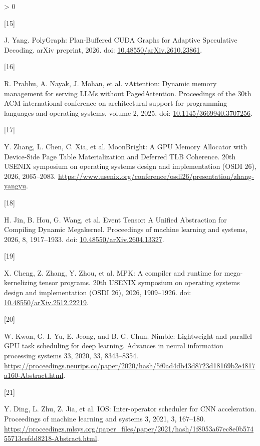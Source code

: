 \documentclass[UTF8,10.5pt,fontset=windows]{ctexart}
\newlength{\cslhangindent}
\newlength{\csllabelwidth}
\newenvironment{CSLReferences}[2] %
 {%
  \setlength{\parindent}{0pt}
  \ifodd #1 \everypar{\setlength{\hangindent}{\cslhangindent}}\ignorespaces\fi
  \ifnum #2 > 0
  \setlength{\parskip}{#2\baselineskip}
  \fi
 }%
 {}
\newcommand{\CSLLeftMargin}[1]{\parbox[t]{\csllabelwidth}{#1}}
\newcommand{\CSLRightInline}[1]{\parbox[t]{\linewidth - \csllabelwidth}{#1}\break}
\begin{document}
\begin{CSLReferences}{0}{0}
\leavevmode{}%
\CSLLeftMargin{{[}15{]} }
\CSLRightInline{J. Yang. {PolyGraph: Plan-Buffered CUDA Graphs for
Adaptive Speculative Decoding}. arXiv preprint, 2026. doi:
\href{https://doi.org/10.48550/arXiv.2610.23861}{10.48550/arXiv.2610.23861}.}

\leavevmode{}%
\CSLLeftMargin{{[}16{]} }
\CSLRightInline{R. Prabhu, A. Nayak, J. Mohan, et al. {vAttention}:
Dynamic memory management for serving {LLMs} without {PagedAttention}.
Proceedings of the 30th ACM international conference on architectural
support for programming languages and operating systems, volume 2, 2025.
doi:
\href{https://doi.org/10.1145/3669940.3707256}{10.1145/3669940.3707256}.}

\leavevmode{}%
\CSLLeftMargin{{[}17{]} }
\CSLRightInline{Y. Zhang, L. Chen, C. Xia, et al. {MoonBright: A GPU
Memory Allocator with Device-Side Page Table Materialization and
Deferred TLB Coherence}. 20th USENIX symposium on operating systems
design and implementation (OSDI 26), 2026, 2065--2083.
\url{https://www.usenix.org/conference/osdi26/presentation/zhang-yangyu}.}

\leavevmode{}%
\CSLLeftMargin{{[}18{]} }
\CSLRightInline{H. Jin, B. Hou, G. Wang, et al. {Event Tensor: A Unified
Abstraction for Compiling Dynamic Megakernel}. Proceedings of machine
learning and systems, 2026, 8, 1917--1933. doi:
\href{https://doi.org/10.48550/arXiv.2604.13327}{10.48550/arXiv.2604.13327}.}

\leavevmode{}%
\CSLLeftMargin{{[}19{]} }
\CSLRightInline{X. Cheng, Z. Zhang, Y. Zhou, et al. MPK: A compiler and
runtime for mega-kernelizing tensor programs. 20th USENIX symposium on
operating systems design and implementation (OSDI 26), 2026, 1909--1926.
doi:
\href{https://doi.org/10.48550/arXiv.2512.22219}{10.48550/arXiv.2512.22219}.}

\leavevmode{}%
\CSLLeftMargin{{[}20{]} }
\CSLRightInline{W. Kwon, G.-I. Yu, E. Jeong, and B.-G. Chun. Nimble:
Lightweight and parallel GPU task scheduling for deep learning. Advances
in neural information processing systems 33, 2020, 33, 8343--8354.
\url{https://proceedings.neurips.cc/paper/2020/hash/5f0ad4db43d8723d18169b2e4817a160-Abstract.html}.}

\leavevmode{}%
\CSLLeftMargin{{[}21{]} }
\CSLRightInline{Y. Ding, L. Zhu, Z. Jia, et al. IOS: Inter-operator
scheduler for CNN acceleration. Proceedings of machine learning and
systems 3, 2021, 3, 167--180.
\url{https://proceedings.mlsys.org/paper_files/paper/2021/hash/1f8053a67ec8e0b57455713cefdd8218-Abstract.html}.}


\end{CSLReferences}
\end{document}
